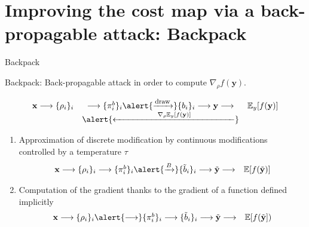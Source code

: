 \documentclass[10pt,aspectratio=169]{beamer}
\begin{document}
\section{Improving the cost map via a back-propagable attack: Backpack}


\begin{frame}{Backpack}

    \alert{Backpack}: \alert{Back-p}ropagable att\alert{ack} \pause in order to compute \alert{$\nabla_{\rho} f(\mathbf{y})$}.

    \begin{equation*}
        \begin{array}{ccccccccccc}
            \mathbf{x} \longrightarrow \{\rho_i\}_i & \longrightarrow  \{\pi_i^b\}_i    \alert{\xrightarrow{\mbox{\footnotesize{draw}}}}  \{b_i\}_i   \longrightarrow  \mathbf{y}  \longrightarrow  & \mathbb{E}_{y} [f(\mathbf{y})] \\ 
            & \alert{\xleftarrow{\hspace{5em} \nabla_\rho \mathbb{E}_{y} [f(\mathbf{y})]\hspace{5em}}} 
        \end{array}
    \end{equation*}
        
    \pause
    \begin{enumerate}
        \item Approximation of discrete modification by continuous modifications controlled by a temperature $\tau$ 
            \begin{equation*}
                \begin{array}{ccccccccccc}
                    \mathbf{x} \longrightarrow \{\rho_i\}_i \longrightarrow  \{\pi_i^b\}_i    \alert{\xrightarrow{B} } \{\tilde{b}_i\}_i   \longrightarrow  \tilde{\mathbf{y}}  \longrightarrow  & \mathbb{E}[f(\tilde{\mathbf{y}})]
                \end{array}
            \end{equation*}
    
        \pause
        \item Computation of the gradient thanks to the gradient of a function defined implicitly
            \begin{equation*}
                \begin{array}{ccccccccccc}
                    \mathbf{x} \longrightarrow \{\rho_i\}_i \alert{\longrightarrow}  \{\pi_i^b\}_i    \longrightarrow \{\tilde{b}_i\}_i \longrightarrow  \tilde{\mathbf{y}}  \longrightarrow  & \mathbb{E}[f(\tilde{\mathbf{y}}])
                \end{array}
            \end{equation*}
    \end{enumerate}

\end{frame}
\end{document}
